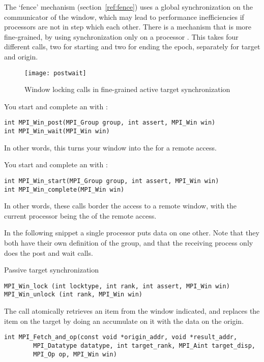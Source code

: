 The `fence' mechanism (section~\ref{ref:fence}) uses a global synchronization on the
communicator of the window, which may 
lead to performance inefficiencies if processors are not in step which each other. 
There is a mechanism that is more fine-grained, by using synchronization only 
on a processor . This takes four different calls, two for starting
and two for ending the epoch, separately for target and origin.
\begin{figure}[ht]
  \texttt{[image: postwait]}
  \caption{Window locking calls in fine-grained active target synchronization}
  \label{fig:postwait}
\end{figure}

You start and complete an  with%
:
\begin{verbatim}
int MPI_Win_post(MPI_Group group, int assert, MPI_Win win)
int MPI_Win_wait(MPI_Win win)
\end{verbatim}
In other words, this turns your window into the  for a remote access.

You start and complete an  with%
:
\begin{verbatim}
int MPI_Win_start(MPI_Group group, int assert, MPI_Win win)
int MPI_Win_complete(MPI_Win win)
\end{verbatim}
In other words, these calls border the access to a remote window, with the current processor
being the  of the remote access.

In the following snippet a single processor puts data on one
other. Note that they both have their own definition of the group, and
that the receiving process only does the post and wait calls.

 {Passive target synchronization}

\begin{verbatim}
MPI_Win_lock (int locktype, int rank, int assert, MPI_Win win)
MPI_Win_unlock (int rank, MPI_Win win)
\end{verbatim}

The  call atomically retrieves an item from the window
indicated, and replaces the item on the target by doing an accumulate on it
with the data on the origin.
\begin{verbatim}
int MPI_Fetch_and_op(const void *origin_addr, void *result_addr,
        MPI_Datatype datatype, int target_rank, MPI_Aint target_disp,
        MPI_Op op, MPI_Win win)
\end{verbatim}

